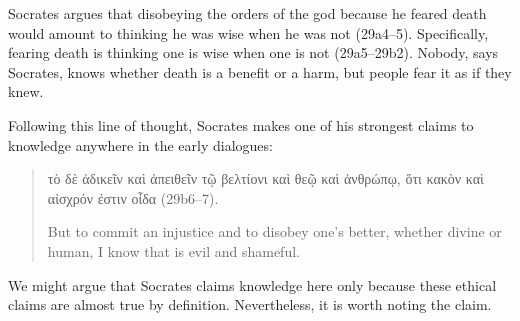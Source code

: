 \documentclass[11pt]{article}
\begin{document}
Socrates argues that disobeying the orders of the god because he feared death would amount to thinking he was wise when he was not (29a4--5).  Specifically, fearing death is thinking one is wise when one is not (29a5--29b2).  Nobody, says Socrates, knows whether death is a benefit or a harm, but people fear it as if they knew.

Following this line of thought, Socrates makes one of his strongest claims to knowledge anywhere in the early dialogues:

\begin{quote}
    τὸ δὲ ἀδικεῖν καὶ ἀπειθεῖν τῷ βελτίονι καὶ θεῷ καὶ ἀνθρώπῳ, ὅτι κακὸν καὶ αἰσχρόν ἐστιν οἶδα (29b6--7).

    But to commit an injustice and to disobey one's better, whether divine or human, I know that is evil and shameful.
\end{quote}

We might argue that Socrates claims knowledge here only because these ethical claims are almost true by definition.  Nevertheless, it is worth noting the claim.




\newpage


\end{document}
